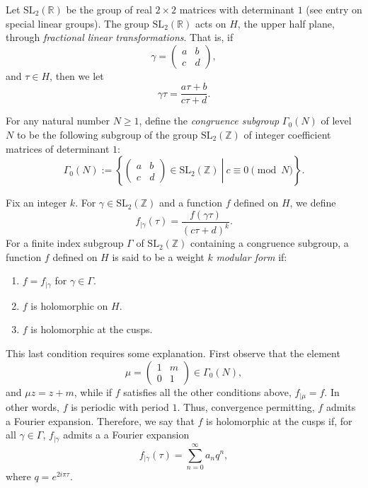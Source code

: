 \documentclass[12pt]{article}
\newcommand{\sldeuxz}{\textrm{SL}_{2}(\mathbb{Z})}
\newcommand{\sldeuxr}{\textrm{SL}_{2}(\mathbb{R})}
\begin{document}
Let $\sldeuxr$ be the group of real $2\times 2$ matrices with determinant $1$ (see entry on special linear groups).  The group $\sldeuxr$ acts on $H$, the upper half plane, through \emph{fractional linear transformations}.  That is, if
\[
\gamma = \begin{pmatrix}a & b \\ c & d\end{pmatrix},
\]
and $\tau\in H$, then we let
\begin{equation}
\gamma \tau=\frac{a\tau+b}{c\tau+d}.
\end{equation}

For any natural number $N \geq 1$, define the {\em congruence subgroup} $\Gamma_0(N)$ of level $N$ to be the following subgroup of the group $\sldeuxz$ of integer coefficient matrices of determinant $1$:
$$
\Gamma_0(N) := \left\{ \left.
\begin{pmatrix}
a & b \\
c & d
\end{pmatrix}
\in \sldeuxz\ \right|\ c \equiv 0 \pmod{N} \right\}.
$$

Fix an integer $k$.  For $\gamma\in\sldeuxz$ and a function $f$ defined on $H$, we define $$f_{\mid\gamma}(\tau)=\frac{f(\gamma \tau)}{(c\tau+d)^k}.$$
For a finite index subgroup $\Gamma$ of $\sldeuxz$ containing a congruence subgroup, a function $f$ defined on $H$ is said to be a weight $k$ \emph{modular form} if:
\begin{enumerate}
\item $f=f_{\mid \gamma}$ for $\gamma \in \Gamma$.
\item $f$ is holomorphic on $H$.
\item $f$ is holomorphic at the cusps.
\end{enumerate}

This last condition requires some explanation.  First observe that the element 
\[
\mu =
\begin{pmatrix}
1 & m \\
0 & 1
\end{pmatrix}
\in \Gamma_0(N),
\]
and $\mu z = z + m$, while if $f$ satisfies all the other conditions above, $f_{\mid \mu} = f$.  In other words, $f$ is periodic with period $1$.  Thus, convergence permitting, $f$ admits a Fourier expansion.  Therefore, we say that $f$ is holomorphic at the cusps if, for all $\gamma \in \Gamma$, $f_{\mid \gamma}$ admits a a Fourier expansion
\begin{equation}
f_{\mid \gamma}(\tau)=\sum_{n=0}^{\infty}a_{n}q^{n},
\end{equation}
where $q=e^{2i\pi \tau}$.
\end{document}
